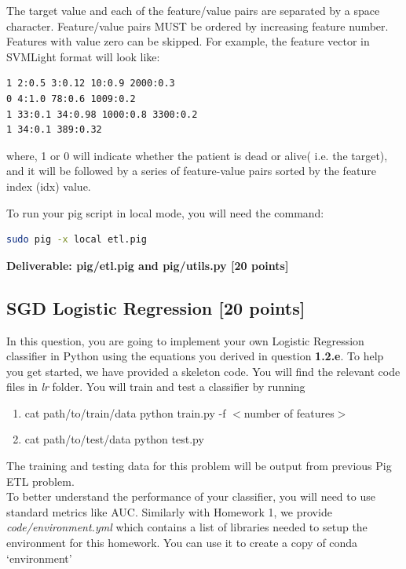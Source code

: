 \documentclass[12pt]{article}
\begin{document}
\begin{enumerate}
The target value and each of the feature/value pairs are separated by a space character. Feature/value pairs MUST be ordered by increasing feature number. Features with value zero can be skipped. For example, the feature vector in SVMLight format will look like: \\

\begin{lstlisting}[frame=single, language=bash]
1 2:0.5 3:0.12 10:0.9 2000:0.3
0 4:1.0 78:0.6 1009:0.2
1 33:0.1 34:0.98 1000:0.8 3300:0.2
1 34:0.1 389:0.32 
\end{lstlisting}

where, 1 or 0 will indicate whether the patient is dead or alive( i.e. the target), and it will be followed by a series of feature-value pairs sorted by the feature index (idx) value. 
\newline
\end{enumerate}
To run your pig script in local mode, you will need the command:  
\begin{lstlisting}[frame=single,language=bash]
sudo pig -x local etl.pig
\end{lstlisting}

\textbf{Deliverable: pig/etl.pig and pig/utils.py [20 points]}

\subsection{SGD Logistic Regression [20 points]}
In this question, you are going to implement your own Logistic Regression classifier in Python using the equations you derived in question \textbf{1.2.e}. To help you get started, we have provided a skeleton code. You will find the relevant code files in \textit{lr} folder. You will train and test a classifier by running 
\begin{enumerate}
\item cat path/to/train/data \textbar{} python train.py -f $<$number of features$>$
\item cat path/to/test/data \textbar{} python test.py 
\end{enumerate}
The training and testing data for this problem will be output from previous Pig ETL problem. \\

To better understand the performance of your classifier, you will need to use standard metrics like AUC. Similarly with Homework 1, we provide \textit{code/environment.yml} which contains a list of libraries needed to setup the environment for this homework. You can use it to create a copy of conda `environment' 
\end{document}
